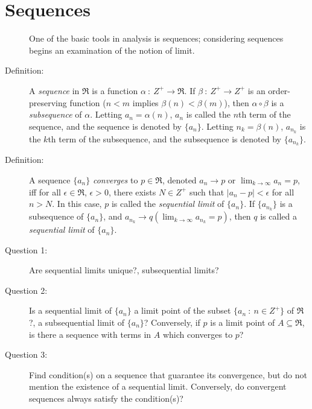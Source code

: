\documentclass{article}
\begin{document}
\newpage

\section{Sequences}

\begin{description}

  \item[] One of the basic tools in analysis is sequences; considering sequences begins an examination of the notion of limit.

  \item[Definition:] A \emph{sequence} in $\Re$ is a function $\alpha\ :\ Z^+ \rightarrow \Re$. If $\beta\ :\ Z^+ \rightarrow Z^+$ is an order-preserving function ($n < m$ implies $\beta(n) < \beta(m)$), then $\alpha \circ \beta$ is a \emph{subsequence} of $\alpha$. Letting $a_n = \alpha(n)$, $a_n$ is called the $n$th term of the sequence, and the sequence is denoted by $\{ a_n \}$. Letting $n_k = \beta(n)$, $a_{n_k}$ is the $k$th term of the subsequence, and the subsequence is denoted by $\{ a_{n_k} \}$.

  \item[Definition:] A sequence $\{ a_n \}$ \emph{converges} to $p \in \Re$, denoted $a_n \rightarrow p$ or $\displaystyle \lim_{k \to \infty} a_n = p$, iff for all $\epsilon \in \Re$, $\epsilon > 0$, there exists $N \in Z^+$ such that $|a_n - p| < \epsilon$ for all $n > N$. In this case, $p$ is called the \emph{sequential limit} of $\{ a_n \}$. If $\{ a_{n_k} \}$ is a subsequence of $\{ a_n \}$, and $\displaystyle a_{n_k} \rightarrow q \left( \lim_{k \to \infty} a_{n_k} = p \right)$, then $q$ is called a \emph{sequential limit} of $\{ a_n \}$.

  \item[Question 1:] Are sequential limits unique?, subsequential limits?

  \item[Question 2:] Is a sequential limit of $\{ a_n \}$ a limit point of the subset $\{ a_n\ :\ n \in Z^+ \}$ of $\Re$?, a subsequential limit of $\{ a_n \}$? Conversely, if $p$ is a limit point of $A \subseteq \Re$, is there a sequence with terms in $A$ which converges to $p$?

  \item[Question 3:] Find condition(s) on a sequence that guarantee its convergence, but do not mention the existence of a sequential limit. Conversely, do convergent sequences always satisfy the condition(s)?


\end{description}
\end{document}
